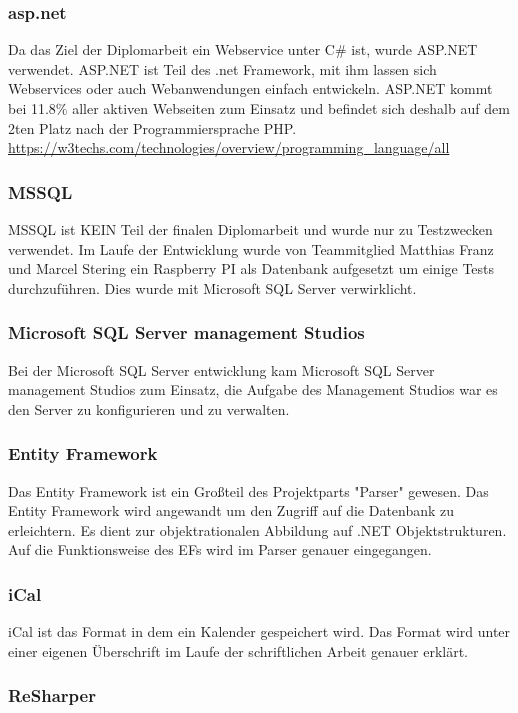 \documentclass[12pt]{scrartcl}
\begin{document}
\subsubsection {asp.net}
Da das Ziel der Diplomarbeit ein Webservice unter C\# ist, wurde ASP.NET verwendet. ASP.NET ist Teil des .net Framework, mit ihm lassen sich Webservices oder auch Webanwendungen einfach entwickeln. ASP.NET kommt bei 11.8\% aller aktiven Webseiten zum Einsatz und befindet sich deshalb auf dem 2ten Platz nach der Programmiersprache PHP. 
\url {https://w3techs.com/technologies/overview/programming_language/all} 
\subsubsection {MSSQL}
MSSQL ist KEIN Teil der finalen Diplomarbeit und wurde nur zu Testzwecken verwendet. Im Laufe der Entwicklung wurde von Teammitglied Matthias Franz und Marcel Stering ein Raspberry PI als Datenbank aufgesetzt um einige Tests durchzuführen. Dies wurde mit Microsoft SQL Server verwirklicht. 
\subsubsection {Microsoft SQL Server management Studios}
Bei der Microsoft SQL Server entwicklung kam Microsoft SQL Server management Studios zum Einsatz, die Aufgabe des Management Studios war es den Server zu konfigurieren und zu verwalten. 
\subsubsection {Entity Framework}
Das Entity Framework ist ein Großteil des Projektparts "Parser" gewesen. Das Entity Framework wird angewandt um den Zugriff auf die Datenbank zu erleichtern. Es dient zur objektrationalen Abbildung auf .NET Objektstrukturen. Auf die Funktionsweise des EFs wird im Parser genauer eingegangen.

\subsubsection {iCal}
iCal ist das Format in dem ein Kalender gespeichert wird. Das Format wird unter einer eigenen Überschrift im Laufe der schriftlichen Arbeit genauer erklärt. 
\subsubsection {ReSharper}
\end{document}
